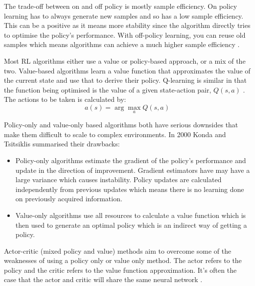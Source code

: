 \documentclass[../main.tex]{subfiles}
\begin{document}
The trade-off between on and off policy is mostly sample efficiency. On policy learning has to always generate new samples and so has a low sample efficiency. This can be a positive as it means more stability since the algorithm directly tries to optimise the policy's performance. With off-policy learning, you can reuse old samples which means algorithms can achieve a much higher sample efficiency \cite{sutton_reinforcement_2018}. 



Most RL algorithms either use a value or policy-based approach, or a mix of the two. Value-based algorithms learn a value function that approximates the value of the current state and use that to derive their policy. Q-learning is similar in that the function being optimised is the value of a given state-action pair, $Q(s, a)$ \cite{watkins_q-learning_1992}. The actions to be taken is calculated by:
$$
a(s) = \arg\!\max_{a} Q(s,a)
$$

Policy-only and value-only based algorithms both have serious downsides that make them difficult to scale to complex environments. In 2000 Konda and Tsitsiklis \cite{konda_actor-critic_2000} summarised their drawbacks:

\begin{itemize}
  \item  Policy-only algorithms estimate the gradient of the policy's performance and update in the direction of improvement. Gradient estimators have may have a large variance which causes instability. Policy updates are calculated independently from previous updates which means there is no learning done on previously acquired information. 
  \item  Value-only algorithms use all resources to calculate a value function which is then used to generate an optimal policy which is an indirect way of getting a policy. 
\end{itemize}

Actor-critic (mixed policy and value) methods aim to overcome some of the weaknesses of using a policy only or value only method. The actor refers to the policy and the critic refers to the value function approximation. It's often the case that the actor and critic will share the same neural network \cite{mnih_asynchronous_2016}. 
\end{document}
